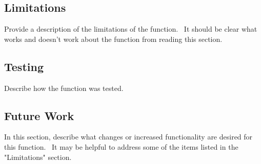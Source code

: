 \documentclass[12pt]{article}%
\begin{document}
\subsection*{Limitations}

Provide a description of the limitations of the function. \ It should be clear
what works and doesn't work about the function from reading this section. \ 

\subsection*{Testing}

Describe how the function was tested. \ 

\subsection*{Future Work}

In this section, describe what changes or increased functionality are desired
for this function. \ It may be helpful to address some of the items listed in
the "Limitations" section. 
\end{document}
